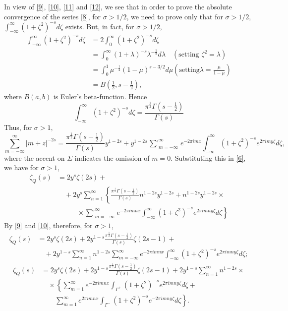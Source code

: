 In view of \eqref{9}, \eqref{10}, \eqref{11} and \eqref{12}, we see
that in order to prove the absolute convergence of the series
\eqref{8}, for $\sigma>1/2$, we need to prove only that for
$\sigma>1/2$, $\int^{\infty}_{-\infty}(1+\zeta^{2})^{-s}d\zeta$
exists. But, in fact, for $\sigma>1/2$,
\begin{align*}
\int^{\infty}_{-\infty}(1+\zeta^{2})^{-s}d\zeta &=
2\int^{\infty}_{0}(1+\zeta^{2})^{-s}d\zeta\\ 
&=
\int^{\infty}_{0}(1+\lambda)^{-s}\lambda^{-\frac{1}{2}}d\lambda\quad
(\text{setting } \zeta^{2}=\lambda)\\
&=
\int^{1}_{0}\mu^{-\frac{1}{2}}(1-\mu)^{s-3/2}d\mu\left(\text{setting
}\lambda=\frac{\mu}{1-\mu}\right)\\
&= B\left(\frac{1}{2},s-\frac{1}{2}\right), 
\end{align*}
where $B(a,b)$ is Euler's beta-function. Hence
$$
\int^{\infty}_{-\infty}(1+\zeta^{2})^{-s}d\zeta=\frac{\pi^{\frac{1}{2}}\Gamma(s-\frac{1}{2})}{\Gamma(s)} 
$$
Thus, for $\sigma>1$, 
{\fontsize{10}{12}\selectfont
$$
\sum^{\infty}_{m=-\infty}|m+z|^{-2s}=\frac{\pi^{\frac{1}{2}}\Gamma(s-\frac{1}{2})}{\Gamma(s)}y^{1-2s}+y^{1-2s}\mathop{{\sum}'}^{\infty}_{m=-\infty}
e^{-2\pi imx}\int^{\infty}_{-\infty}(1+\zeta^{2})^{-s}e^{2\pi
  imy\zeta}d\zeta, 
$$}\pageoriginale
where the accent on $\Sigma$ indicates the omission of
$m=0$. Substituting this in \eqref{6}, we have for $\sigma>1$,
\begin{align*}
\zeta_{Q}(s) &= 2y^{s}\zeta(2s)+\\
  &\quad
  +2y^{s}\sum^{\infty}_{n=1}\left\{\frac{\pi^{\frac{1}{2}}\Gamma(s-\frac{1}{2})}{\Gamma(s)}n^{1-2s}y^{1-2s}+n^{1-2s}y^{1-2s}\times\right.\\
&\qquad\quad \left.\times
  \mathop{{\sum}'}^{\infty}_{m=-\infty}e^{-2\pi
    imnx}\int^{\infty}_{-\infty}(1+\zeta^{2})^{-s}e^{2\pi imny\zeta}d\zeta\right\}
\end{align*}
By \eqref{9} and \eqref{10}, therefore, for $\sigma>1$,
\begin{align*}
\zeta_{Q}(s) &=
2y^{s}\zeta(2s)+2y^{1-s}\frac{\pi^{\frac{1}{2}}\Gamma(s-\frac{1}{2})}{\Gamma(s)}\zeta(2s-1)+\\
&\quad
+2y^{1-s}\sum^{\infty}_{n=1}n^{1-2s}\sum^{\infty}_{m=-\infty}e^{-2\pi
  imnx}\int^{\infty}_{-\infty}(1+\zeta^{2})^{-s}e^{2\pi
  imny\zeta}d\zeta; 
\end{align*}
\ie
\begin{align*}
\zeta_{Q}(s) &=
2y^{s}\zeta(2s)+2y^{1-s}\frac{\pi^{\frac{1}{2}}\Gamma(s-\frac{1}{2})}{\Gamma(s)}\zeta(2s-1)+2y^{1-s}\sum^{\infty}_{n=1}n^{1-2s}\times\\
&\quad \times \left\{\sum^{\infty}_{m=1}e^{-2\pi
  imnx}\int_{\Gamma^{+}}(1+\zeta^{2})^{-s}e^{2\pi
  imny\zeta}d\zeta+\right.\\
&\qquad \left.\sum^{\infty}_{m=1}e^{2\pi
  imnx}\int_{\Gamma^{-}}(1+\zeta^{2})^{-s}e^{-2\pi
  imny\zeta}d\zeta\right\}.\tag{13}\label{13} 
\end{align*}
